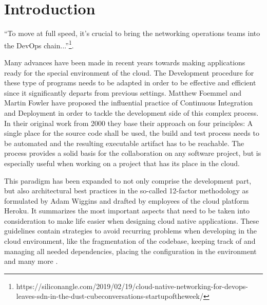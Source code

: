 	\section{Introduction}
%

``To move at full speed, it’s crucial to bring the networking operations teams into the DevOps chain...''\footnote{https://siliconangle.com/2019/02/19/cloud-native-networking-for-devops-leaves-sdn-in-the-dust-cubeconversations-startupoftheweek/}.

Many advances have been made in recent years towards making applications ready for the special environment of the cloud. The Development procedure for these type of programs needs to be adapted in order to be effective and efficient since it significantly departs from previous settings. Matthew Foemmel and Martin Fowler have proposed the influential practice of Continuous Integration and Deployment \cite{fowler_2006} \cite{fowler_foemmel_2000} in order to tackle the development side of this complex process. In their original work from 2000 they base their approach on four principles: A single place for the source code shall be used, the build and test process needs to be automated and the resulting executable artifact has to be reachable.
The process provides a solid basis for the collaboration on any software project, but is especially useful when working on a project that has its place in the cloud. 

This paradigm has been expanded to not only comprise the development part, but also architectural best practices in the so-called 12-factor methodology as formulated by Adam Wiggins and drafted by employees of the cloud platform Heroku. It summarizes the most important aspects that need to be taken into consideration to make life easier when designing cloud native applications. These guidelines contain strategies to avoid recurring problems when developing in the cloud environment, like the fragmentation of the codebase, keeping track of and managing all needed dependencies, placing the configuration in the environment and many more \cite{hofmann2017microservices} \cite{12Factor}. 

